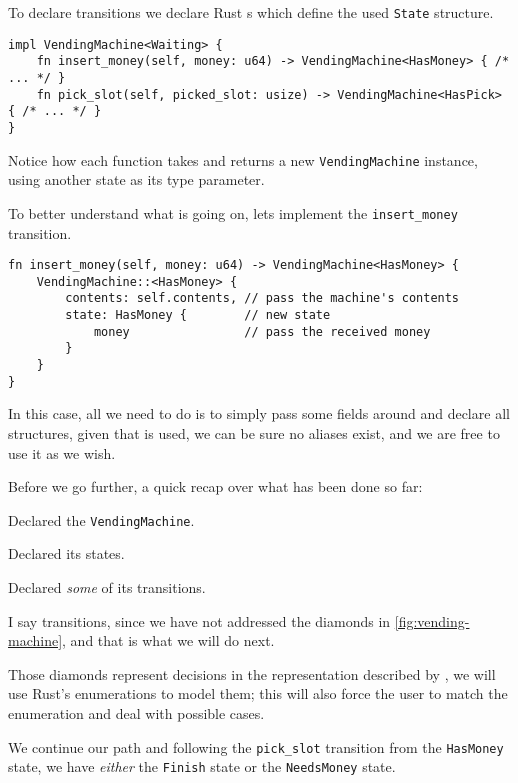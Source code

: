 To declare transitions we declare Rust s which define the used \texttt{State} structure.

\begin{verbatim}
impl VendingMachine<Waiting> {
    fn insert_money(self, money: u64) -> VendingMachine<HasMoney> { /* ... */ }
    fn pick_slot(self, picked_slot: usize) -> VendingMachine<HasPick> { /* ... */ }
}
\end{verbatim}

Notice how each function takes  and returns a new \texttt{VendingMachine} instance,
using another state as its type parameter.

To better understand what is going on, lets implement the \texttt{insert\_money} transition.

\begin{verbatim}
fn insert_money(self, money: u64) -> VendingMachine<HasMoney> {
    VendingMachine::<HasMoney> {
        contents: self.contents, // pass the machine's contents
        state: HasMoney {        // new state
            money                // pass the received money
        }
    }
}
\end{verbatim}

In this case, all we need to do is to simply pass some fields around and declare all structures,
given that  is used, we can be sure no aliases exist, and we are free to use it as we wish.

Before we go further, a quick recap over what has been done so far:
\begin{compactitem}
    \item Declared the \texttt{VendingMachine}.
    \item Declared its states.
    \item Declared \emph{some} of its transitions.
\end{compactitem}

I say  transitions, since we have not addressed the diamonds in \autoref{fig:vending-machine},
and that is what we will do next.

Those diamonds represent decisions in the representation described by \autocite{Trindade2020},
we will use Rust's enumerations to model them;
this will also force the user to match the enumeration and deal with possible cases.

We continue our path and following the \texttt{pick\_slot} transition from the \texttt{HasMoney} state,
we have \emph{either} the \texttt{Finish} state or the \texttt{NeedsMoney} state.

